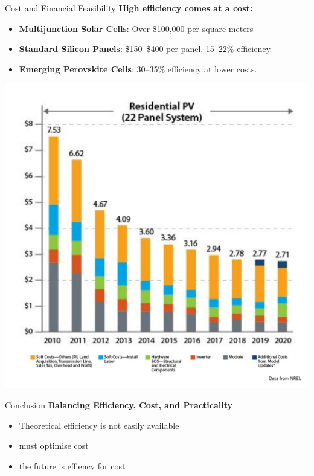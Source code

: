 \documentclass[aspectratio=169]{beamer} %
\begin{document}
\begin{frame}{Cost and Financial Feasibility}
    \textbf{High efficiency comes at a cost:}
    \begin{itemize}
        \item \textbf{Multijunction Solar Cells}: Over \$100,000 per square meters
        \item \textbf{Standard Silicon Panels}: \$150--\$400 per panel, 15--22\% efficiency.
        \item \textbf{Emerging Perovskite Cells}: 30--35\% efficiency at lower costs.
    \end{itemize}
    \centering
    \includegraphics[width=0.6\linewidth]{solar_costs.png} %
\end{frame}

\begin{frame}{Conclusion}
    \textbf{Balancing Efficiency, Cost, and Practicality}
    \begin{itemize}
        \item Theoretical efficiency is not easily available
        \item must optimise cost
        \item the future is effiency for cost
    \end{itemize}
\end{frame}
\end{document}
